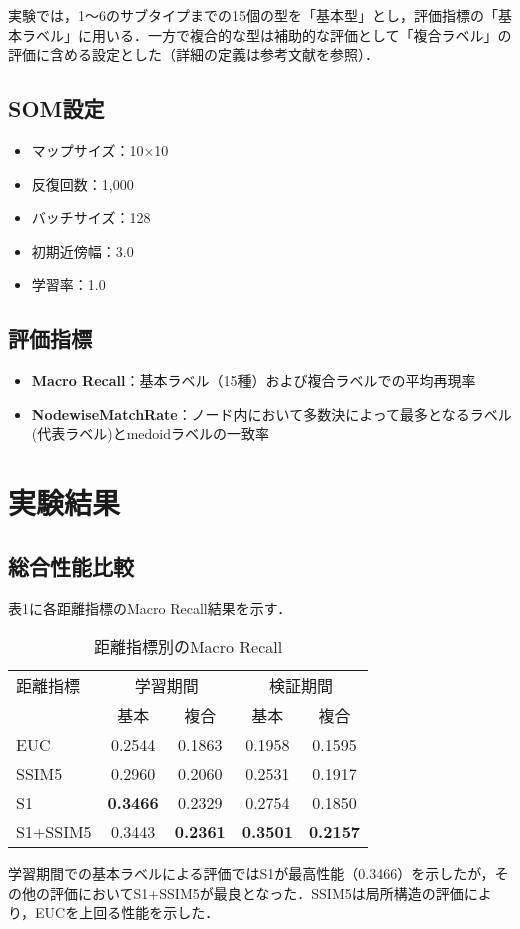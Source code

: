 \documentclass{jarticle}
\theoremstyle{definition}
\begin{document}
実験では，1〜6のサブタイプまでの15個の型を「基本型」とし，評価指標の「基本ラベル」に用いる．一方で複合的な型は補助的な評価として「複合ラベル」の評価に含める設定とした（詳細の定義は参考文献\cite{吉野2002日本の気候}を参照）．

\subsection{SOM設定}
\begin{itemize}
\item マップサイズ：10×10
\item 反復回数：1,000
\item バッチサイズ：128
\item 初期近傍幅：3.0
\item 学習率：1.0
\end{itemize}
\subsection{評価指標}
\begin{itemize}
\item \textbf{Macro Recall}：基本ラベル（15種）および複合ラベルでの平均再現率
\item \textbf{NodewiseMatchRate}：ノード内において多数決によって最多となるラベル(代表ラベル)とmedoidラベルの一致率
\end{itemize}
\section{実験結果}
\subsection{総合性能比較}
表1に各距離指標のMacro Recall結果を示す．
\begin{table}[h]
\caption{距離指標別のMacro Recall}
\centering
\begin{tabular}{lcccc}
\hline
距離指標 & \multicolumn{2}{c}{学習期間} & \multicolumn{2}{c}{検証期間} \\
& 基本 & 複合 & 基本 & 複合 \\
\hline
EUC & 0.2544 & 0.1863 & 0.1958 & 0.1595 \\
SSIM5 & 0.2960 & 0.2060 & 0.2531 & 0.1917 \\
S1 & \textbf{0.3466} & 0.2329 & 0.2754 & 0.1850 \\
S1+SSIM5 & 0.3443 & \textbf{0.2361} & \textbf{0.3501} & \textbf{0.2157} \\
\hline
\end{tabular}
\end{table}
学習期間での基本ラベルによる評価ではS1が最高性能（0.3466）を示したが，その他の評価においてS1+SSIM5が最良となった．SSIM5は局所構造の評価により，EUCを上回る性能を示した．
\end{document}
